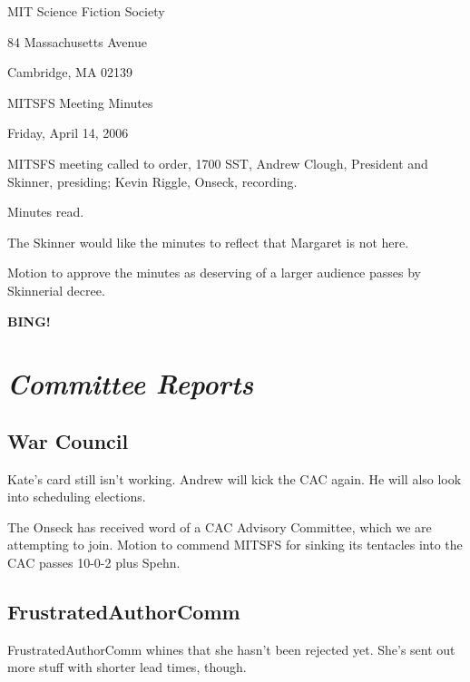 \documentclass[10pt]{article}
\newcommand{\bing}{{\bf BING!} }
\newcommand{\goto}[1]{\bing \vskip 12pt \section*{{\em{#1}}}}
\newcommand{\ps}{ plus Spehn\xspace}
\begin{document}
\begin{center}

MIT Science Fiction Society

84 Massachusetts Avenue

Cambridge, MA 02139

\vspace{12pt}

MITSFS Meeting Minutes

Friday, April 14, 2006

\end{center}

\vspace{18pt}

\setlength{\parskip}{6pt}

\noindent
MITSFS meeting called to order, 1700 SST,
Andrew Clough, President and Skinner, presiding; Kevin Riggle, Onseck, recording.

Minutes read.

The Skinner would like the minutes to reflect that Margaret is not here.

Motion to approve the minutes as deserving of a larger audience passes by Skinnerial decree.

\goto{Committee Reports}


\subsection*{War Council}
Kate's card still isn't working.  Andrew will kick the CAC again.  He will also look into scheduling 
elections.

The Onseck has received word of a CAC Advisory Committee, which we are attempting to join.
Motion to commend MITSFS for sinking its tentacles into the CAC passes 10-0-2\ps.

\subsection*{FrustratedAuthorComm}
FrustratedAuthorComm whines that she hasn't been rejected yet.  She's sent out more stuff with 
shorter lead times, though.

\end{document}
